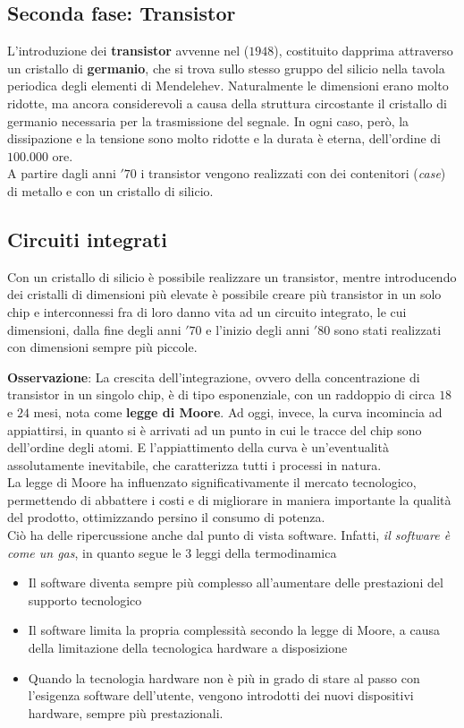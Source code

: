 \documentclass[a4paper]{extarticle}
\begin{document}
\subsection{Seconda fase: Transistor}
L'introduzione dei \textbf{transistor} avvenne nel (\(1948\)), costituito dapprima attraverso un cristallo di \textbf{germanio}, che si trova sullo stesso gruppo del silicio nella tavola periodica degli elementi di Mendelehev. Naturalmente le dimensioni erano molto ridotte, ma ancora considerevoli a causa della struttura circostante il cristallo di germanio necessaria per la trasmissione del segnale. In ogni caso, però, la dissipazione e la tensione sono molto ridotte e la durata è eterna, dell'ordine di \(100.000\) ore.\\
A partire dagli anni \('70\) i transistor vengono realizzati con dei contenitori (\textit{case}) di metallo e con un cristallo di silicio.

\subsection{Circuiti integrati}
Con un cristallo di silicio è possibile realizzare un transistor, mentre introducendo dei cristalli di dimensioni più elevate è possibile creare più transistor in un solo chip e interconnessi fra di loro danno vita ad un circuito integrato, le cui dimensioni, dalla fine degli anni \('70\) e l'inizio degli anni \('80\) sono stati realizzati con dimensioni sempre più piccole.

\vspace{1em}
\noindent
\textbf{Osservazione}: La crescita dell'integrazione, ovvero della concentrazione di transistor in un singolo chip, è di tipo esponenziale, con un raddoppio di circa \(18\) e \(24\) mesi, nota come \textbf{legge di Moore}. Ad oggi, invece, la curva incomincia ad appiattirsi, in quanto si è arrivati ad un punto in cui le tracce del chip sono dell'ordine degli atomi. E l'appiattimento della curva è un'eventualità assolutamente inevitabile, che caratterizza tutti i processi in natura.\\
La legge di Moore ha influenzato significativamente il mercato tecnologico, permettendo di abbattere i costi e di migliorare in maniera importante la qualità del prodotto, ottimizzando persino il consumo di potenza.\\
Ciò ha delle ripercussione anche dal punto di vista software. Infatti, \textit{il software è come un gas}, in quanto segue le \(3\) leggi della termodinamica
\begin{itemize}
    \item Il software diventa sempre più complesso all'aumentare delle prestazioni del supporto tecnologico
    \item Il software limita la propria complessità secondo la legge di Moore, a causa della limitazione della tecnologica hardware a disposizione
    \item Quando la tecnologia hardware non è più in grado di stare al passo con l'esigenza software dell'utente, vengono introdotti dei nuovi dispositivi hardware, sempre più prestazionali.
\end{itemize}
\end{document}
